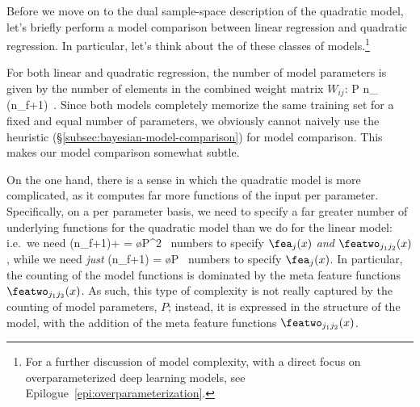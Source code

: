 Before we move on to the dual sample-space description of the quadratic model, 
let's briefly perform a model comparison between linear regression and quadratic regression.
In particular, let's think about the  of these classes of models.\footnote{
    For a further discussion of model complexity,  with a direct focus on overparameterized deep learning models, see Epilogue~\ref{epi:overparameterization}.
}





For both linear and quadratic regression, the number of model parameters is given by the number of elements in the combined weight matrix $W_{ij}$:
\be\label{eq:parameters-in-linear-model}
P \equiv n_{} \times (n_f+1)\, .
\ee
Since both models completely memorize the same training set for a fixed and equal number of parameters,
we obviously cannot naively use the  heuristic (\S\ref{subsec:bayesian-model-comparison}) for model comparison.
This makes our model comparison somewhat subtle.

On the one hand, there is a sense in which the quadratic model is more complicated, as it computes far more functions of the input per parameter. Specifically, on a per parameter basis, we need to specify a far greater number of underlying functions  for the quadratic model than we do for the linear model:
i.e.~we need
\be\label{eq:quadratic-model-feature-to-parameters}
(n_f+1)+ \le[\frac{1}{2}(n_f +1)(n_f+2)\ri] = 
\o{P^2} \,
\ee
numbers to specify $\fea_{j}(x)$ \emph{and} $\featwo_{j_1j_2}(x)$,
while we need \emph{just}
\be\label{eq:linear-model-feature-to-parameters}
(n_f+1)  = \o{P} \, 
\ee
numbers to specify  $\fea_{j}(x)$.
In particular, the counting of the model functions is dominated by the meta feature functions $\featwo_{j_1j_2}(x)$.
As such, this type of complexity is not really captured by the counting of model parameters, $P$; instead, it is expressed in the structure of the model, with the addition of the meta feature functions $\featwo_{j_1j_2}(x)$.


